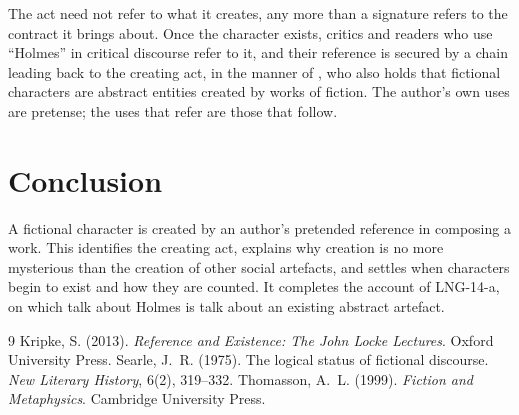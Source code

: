\documentclass{situationist-preprint}
\begin{document}
\begin{reply}
The act need not refer to what it creates, any more than a signature refers to the contract it brings about. Once the character exists, critics and readers who use \enquote{Holmes} in critical discourse refer to it, and their reference is secured by a chain leading back to the creating act, in the manner of \citet{Kripke2013}, who also holds that fictional characters are abstract entities created by works of fiction. The author's own uses are pretense; the uses that refer are those that follow.
\end{reply}

\section{Conclusion}

A fictional character is created by an author's pretended reference in composing a work. This identifies the creating act, explains why creation is no more mysterious than the creation of other social artefacts, and settles when characters begin to exist and how they are counted. It completes the account of LNG-14-a, on which talk about Holmes is talk about an existing abstract artefact.

\begin{thebibliography}{9}\small
{} Kripke, S. (2013). \emph{Reference and Existence: The John Locke Lectures}. Oxford University Press.
 Searle, J.~R. (1975). The logical status of fictional discourse. \emph{New Literary History}, 6(2), 319--332.
 Thomasson, A.~L. (1999). \emph{Fiction and Metaphysics}. Cambridge University Press.
\end{thebibliography}
\end{document}
